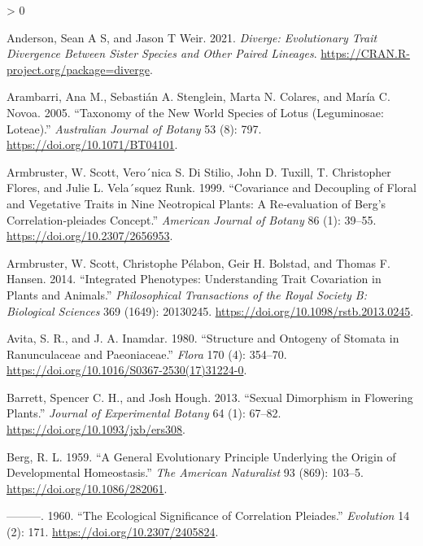 \documentclass[
  10pt,
]{article}
\newlength{\cslhangindent}
\newenvironment{CSLReferences}[2] %
 {%
  \setlength{\parindent}{0pt}
  \ifodd #1 \everypar{\setlength{\hangindent}{\cslhangindent}}\ignorespaces\fi
  \ifnum #2 > 0
  \setlength{\parskip}{#2\baselineskip}
  \fi
 }%
 {}
\begin{document}
\hypertarget{refs}{}
\begin{CSLReferences}{1}{0}
\leavevmode\hypertarget{ref-anderson_diverge_2021}{}%
Anderson, Sean A S, and Jason T Weir. 2021. \emph{Diverge: {Evolutionary} {Trait} {Divergence} {Between} {Sister} {Species} and {Other} {Paired} {Lineages}}. \url{https://CRAN.R-project.org/package=diverge}.

\leavevmode\hypertarget{ref-arambarri_taxonomy_2005}{}%
Arambarri, Ana M., Sebastián A. Stenglein, Marta N. Colares, and María C. Novoa. 2005. {``Taxonomy of the {New} {World} Species of {Lotus} ({Leguminosae}: {Loteae}).''} \emph{Australian Journal of Botany} 53 (8): 797. \url{https://doi.org/10.1071/BT04101}.

\leavevmode\hypertarget{ref-armbruster_covariance_1999}{}%
Armbruster, W. Scott, Vero´nica S. Di Stilio, John D. Tuxill, T. Christopher Flores, and Julie L. Vela´squez Runk. 1999. {``Covariance and Decoupling of Floral and Vegetative Traits in Nine {Neotropical} Plants: A Re‐evaluation of {Berg}'s Correlation‐pleiades Concept.''} \emph{American Journal of Botany} 86 (1): 39--55. \url{https://doi.org/10.2307/2656953}.

\leavevmode\hypertarget{ref-armbruster_integrated_2014}{}%
Armbruster, W. Scott, Christophe Pélabon, Geir H. Bolstad, and Thomas F. Hansen. 2014. {``Integrated Phenotypes: Understanding Trait Covariation in Plants and Animals.''} \emph{Philosophical Transactions of the Royal Society B: Biological Sciences} 369 (1649): 20130245. \url{https://doi.org/10.1098/rstb.2013.0245}.

\leavevmode\hypertarget{ref-avita_structure_1980}{}%
Avita, S. R., and J. A. Inamdar. 1980. {``Structure and {Ontogeny} of {Stomata} in {Ranunculaceae} and {Paeoniaceae}.''} \emph{Flora} 170 (4): 354--70. \url{https://doi.org/10.1016/S0367-2530(17)31224-0}.

\leavevmode\hypertarget{ref-barrett_sexual_2013}{}%
Barrett, Spencer C. H., and Josh Hough. 2013. {``Sexual Dimorphism in Flowering Plants.''} \emph{Journal of Experimental Botany} 64 (1): 67--82. \url{https://doi.org/10.1093/jxb/ers308}.

\leavevmode\hypertarget{ref-berg_general_1959}{}%
Berg, R. L. 1959. {``A {General} {Evolutionary} {Principle} {Underlying} the {Origin} of {Developmental} {Homeostasis}.''} \emph{The American Naturalist} 93 (869): 103--5. \url{https://doi.org/10.1086/282061}.

\leavevmode\hypertarget{ref-berg_ecological_1960}{}%
---------. 1960. {``The {Ecological} {Significance} of {Correlation} {Pleiades}.''} \emph{Evolution} 14 (2): 171. \url{https://doi.org/10.2307/2405824}.


\end{CSLReferences}
\end{document}
